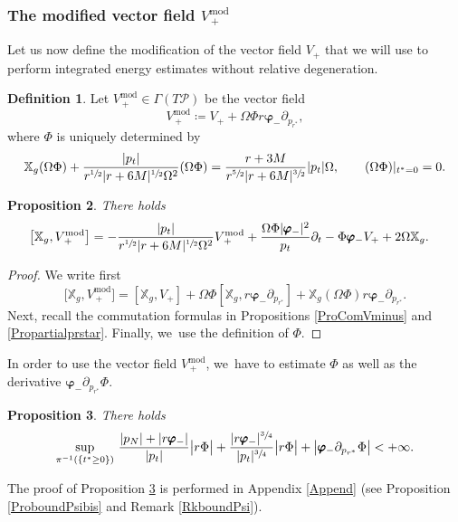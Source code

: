 \documentclass[JEP,XML,SOM,Unicode,published]{cedram}
\theoremstyle{plain}
\newtheorem{proposition}{Proposition}[section]
\theoremstyle{definition}
\newtheorem{definition}[proposition]{Definition}
\newcommand\T{{\mathbb{X}}}
\begin{document}
\subsubsection{The modified vector field $V_{\, +}^{\mathrm{mod}}$}\label{subsub_modified}

Let us now define the modification of the vector field $V_+$ that we will use to perform integrated energy estimates without relative degeneration.

\begin{definition}\label{DefVminusmod}
Let $V_{\, +}^{\mathrm{mod}} \in \Gamma(T \mathcal{P})$ be the vector field
\[
V_{\, +}^{\mathrm{mod}} \coloneqq V_++\Omega \Phi r \pmb{\varphi}_- \partial_{p_{r^*}},
\]
where $\Phi$ is uniquely determined by
\[
\T_g (\Omega \Phi)+ \frac{|p_t|}{r^{\sfrac{1}{2}}|r+6M|^{\sfrac{1}{2}}\Omega^2} (\Omega \Phi) = \frac{r+3M}{r^{\sfrac{5}{2}}|r+6M|^{\sfrac{3}{2}}}|p_t|\Omega, \qquad (\Omega\Phi)\vert_{t^*=0}=0.
\]
\end{definition}

\begin{proposition}\label{ProComVminusmod}
There holds
\begin{align*}
\bigl[\T_g, V_{\, +}^{\mathrm{mod}}\bigr] &= - \frac{|p_t|}{r^{\sfrac{1}{2}}|r+6M|^{\sfrac{1}{2}}\Omega^2} V_{\, +}^{\mathrm{mod}}+ \frac{\Omega\Phi |\pmb{\varphi}_-|^2}{ p_t} \partial_t- \Phi \pmb{\varphi}_- V_+ + 2\Omega \T_g.
\end{align*}
\end{proposition}
\begin{proof}
We write first
\[
\bigl[\T_g, V_{\, +}^{\mathrm{mod}}\bigr] = [\T_g, V_+] +\Omega \Phi [\T_g, r \pmb{\varphi}_- \partial_{p_{r^*}} ]+ \T_g(\Omega\Phi) r \pmb{\varphi}_- \partial_{p_{r^*}}.
\]
Next, recall the commutation formulas in Propositions \ref{ProComVminus} and \ref{Propartialprstar}. Finally, we~use the definition of $\Phi$.
\end{proof}

In order to use the vector field $V_{\, +}^{\mathrm{mod}}$, we~have to estimate $\Phi$ as well as the derivative $\pmb{\varphi}_- \partial_{p_{r^*}} \Phi$.

\begin{proposition}\label{ProboundPsi}
There holds
\[
\sup_{ \pi^{-1} (\{t^* \geq 0 \})} \,\frac{|p_N|+|r \pmb{\varphi}_-|}{|p_t|} \big| r\Phi \big|+\frac{|r\pmb{\varphi}_-|^{\sfrac{3}{4}}}{|p_t|^{\sfrac{3}{4}}} \big| r\Phi \big|+\big|\pmb{\varphi}_- \partial_{p_{r^*}} \Phi \big| < +\infty.
\]
\end{proposition}
The proof of Proposition \ref{ProboundPsi} is performed in Appendix \ref{Append} (see Proposition \ref{ProboundPsibis} and Remark \ref{RkboundPsi}).
\end{document}
